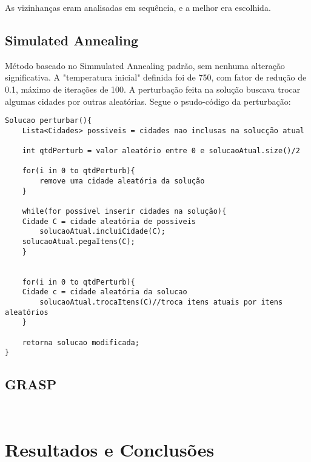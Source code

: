 \documentclass[12pt,14paper,onecolumn]{article}
\begin{document}
As vizinhanças eram analisadas em sequência, e a melhor era escolhida.

\subsection{Simulated Annealing}

Método baseado no Simmulated Annealing padrão, sem nenhuma alteração significativa.
A "temperatura inicial" definida foi de 750, com fator de redução de 0.1, máximo de iterações de 100.
A perturbação feita na solução buscava trocar algumas cidades por outras aleatórias.
Segue o psudo-código da perturbação:

\begin{lstlisting}
Solucao perturbar(){
	Lista<Cidades> possiveis = cidades nao inclusas na solucção atual
	
	int qtdPerturb = valor aleatório entre 0 e solucaoAtual.size()/2

	for(i in 0 to qtdPerturb){
		remove uma cidade aleatória da solução
	}

	while(for possível inserir cidades na solução){
    Cidade C = cidade aleatória de possiveis
		solucaoAtual.incluiCidade(C);
    solucaoAtual.pegaItens(C);
	}


	for(i in 0 to qtdPerturb){
    Cidade c = cidade aleatória da solucao
		solucaoAtual.trocaItens(C)//troca itens atuais por itens aleatórios
	}

	retorna solucao modificada;
}

\end{lstlisting}

\subsection{GRASP}

\begin{lstlisting}


\end{lstlisting}


\section{Resultados e Conclusões}
\end{document}
